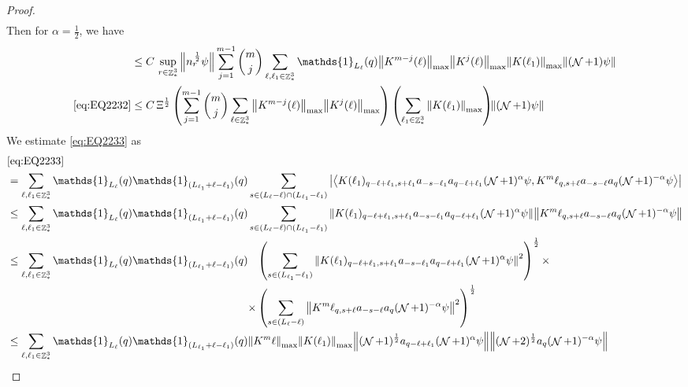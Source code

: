 \documentclass[sn-mathphys, Numbered ,a4paper]{sn-jnl}%
\DeclareMathOperator{\Z}{\mathbb{Z}}
\DeclareMathOperator{\NN}{\mathcal{N}}
\newcommand{\half}{\frac{1}{2}}
\newcommand{\eva}[1]{\left\langle #1 \right\rangle}
\theoremstyle{plain}
\theoremstyle{definition}
\theoremstyle{remark}
\theoremstyle{plain}
\theoremstyle{definition}
\theoremstyle{remark}
\begin{document}
\begin{proof}
\begin{align}
	\end{align} 
	Then for $\alpha = \half$, we have
	\begin{align}
		&\leq C\, \sup\limits_{r \in \Z^3_*} \norm{ n_{r}^{\,\half} \psi } \sum\limits_{j=1}^{m-1} {{m}\choose j} \sum\limits_{\ell, \ell_1\in \Z^3_*} \mathds{1}_{L_{\ell}}(q) \norm{K^{m-j}(\ell)}_{\mathrm{max}} \norm{K^{j}(\ell)}_{\mathrm{max}} \norm{ K(\ell_1)}_{\mathrm{max}} \norm{(\NN+1) \psi} \nonumber\\
		\eqref{eq:EQ2232} &\leq  C \, \Xi^\half \left(  \sum\limits_{j=1}^{m-1} {{m}\choose j} \sum\limits_{\ell \in \Z^3_*} \norm{K^{m-j}(\ell)}_{\mathrm{max}} \norm{ K^{j}(\ell)}_{\mathrm{max}}\right) \left( \sum\limits_{ \ell_1\in \Z^3_*}\norm{ K(\ell_1) }_{\mathrm{max}} \right)\!\! \norm{(\NN+1) \psi }\label{eq:estEQ2232}
	\end{align}
	We estimate \eqref{eq:EQ2233} as
	\begin{align}
		&\eqref{eq:EQ2233}\nonumber\\
		&=\sum\limits_{\ell, \ell_1\in \Z^3_*} \mathds{1}_{L_{\ell}}(q) \mathds{1}_{(L_{\ell_1}+\ell-\ell_1)} (q) \sum\limits_{ s \in (L_{\ell}-\ell) \cap (L_{\ell_1}-\ell_1)} \abs{\eva{K(\ell_1)_{q-\ell+\ell_1,s+\ell_1} a_{-s-\ell_1} a_{q-\ell+\ell_1}  (\NN+1)^{\alpha}\psi, K^m{\ell}_{q,s+\ell}  a_{-s-\ell} a_{q} (\NN+1)^{-\alpha} \psi }} \nonumber\\
		&\leq \sum\limits_{\ell, \ell_1\in \Z^3_*} \mathds{1}_{L_{\ell}}(q) \mathds{1}_{(L_{\ell_1}+\ell-\ell_1)}(q) \sum\limits_{ s \in (L_{\ell}-\ell) \cap (L_{\ell_1}-\ell_1)} \norm{K(\ell_1)_{q-\ell+\ell_1,s+\ell_1} a_{-s-\ell_1} a_{q-\ell+\ell_1}  (\NN+1)^{\alpha}\psi}\norm{ K^m{\ell}_{q,s+\ell}  a_{-s-\ell} a_{q} (\NN+1)^{-\alpha} \psi } \nonumber\\
		&\leq \sum\limits_{\ell, \ell_1\in \Z^3_*} \mathds{1}_{L_{\ell}}(q) \mathds{1}_{(L_{\ell_1}+\ell-\ell_1)}(q) \begin{aligned}[t]&\left(\sum\limits_{ s \in  (L_{\ell_1}-\ell_1)} \norm{K(\ell_1)_{q-\ell+\ell_1,s+\ell_1} a_{-s-\ell_1} a_{q-\ell+\ell_1}  (\NN+1)^{\alpha}\psi}^2\right)^\half \times \nonumber\\ \times &\left( \sum\limits_{ s \in (L_{\ell}-\ell) } \norm{ K^m{\ell}_{q,s+\ell}  a_{-s-\ell} a_{q} (\NN+1)^{-\alpha} \psi }^2\right)^\half \end{aligned}\nonumber\\
		&\leq \sum\limits_{\ell, \ell_1\in \Z^3_*} \mathds{1}_{L_{\ell}}(q) \mathds{1}_{(L_{\ell_1}+\ell-\ell_1)}(q) \norm{K^m{\ell}}_{\mathrm{max}} \norm{K(\ell_1)}_{\mathrm{max}} \norm{ (\NN+1)^\half a_{q-\ell+\ell_1}  (\NN+1)^{\alpha}\psi} \norm{  (\NN+2)^\half  a_{q} (\NN+1)^{-\alpha} \psi } \nonumber

\end{align}
\end{proof}
\end{document}
